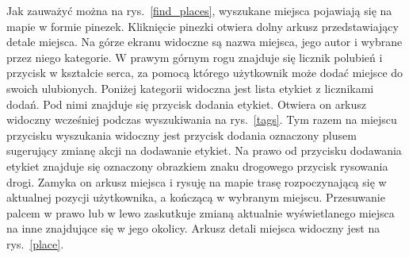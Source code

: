         Jak zauważyć można na rys.~\ref{find_places}, wyszukane miejsca pojawiają się na mapie w formie pinezek. Kliknięcie pinezki otwiera dolny arkusz przedstawiający detale miejsca. 
        Na górze ekranu widoczne są nazwa miejsca, jego autor i wybrane przez niego kategorie. W prawym górnym rogu znajduje się licznik polubień i przycisk w kształcie serca, za pomocą którego użytkownik
        może dodać miejsce do swoich ulubionych. Poniżej kategorii widoczna jest lista etykiet z licznikami dodań. Pod nimi znajduje się przycisk dodania etykiet. Otwiera on arkusz widoczny wcześniej podczas
        wyszukiwania na rys.~\ref{tags}. Tym razem na miejscu przycisku wyszukania widoczny jest przycisk dodania oznaczony plusem sugerujący zmianę akcji na dodawanie etykiet. Na prawo od przycisku dodawania
        etykiet znajduje się oznaczony obrazkiem znaku drogowego przycisk rysowania drogi. Zamyka on arkusz miejsca i rysuję na mapie trasę rozpoczynającą się w aktualnej pozycji użytkownika, a kończącą w
        wybranym miejscu. Przesuwanie palcem w prawo lub w lewo zaskutkuje zmianą aktualnie wyświetlanego miejsca na inne znajdujące się w jego okolicy. Arkusz detali miejsca widoczny jest na 
        rys.~\ref{place}.

